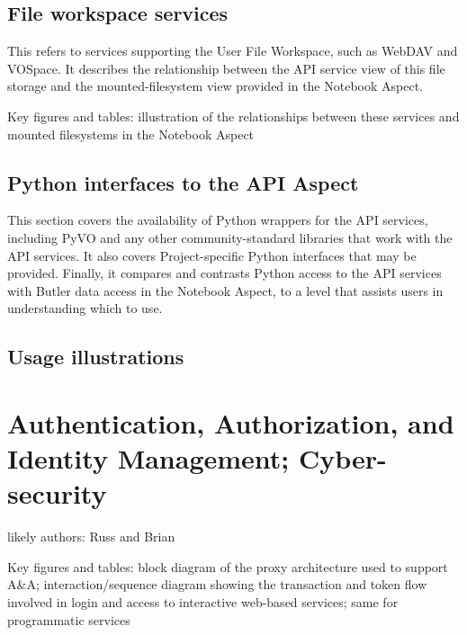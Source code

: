 \subsection{File workspace services}

This refers to services supporting the User File Workspace, such as WebDAV and VOSpace.  It describes the relationship between the API service view of this file storage and the mounted-filesystem view provided in the Notebook Aspect.

Key figures and tables: illustration of the relationships between these services and mounted filesystems in the Notebook Aspect

\subsection{Python interfaces to the API Aspect}

This section covers the availability of Python wrappers for the API services, including PyVO and any other community-standard libraries that work with the API services.  It also covers Project-specific Python interfaces that may be provided.  Finally, it compares and contrasts Python access to the API services with Butler data access in the Notebook Aspect, to a level that assists users in understanding which to use.

\subsection{Usage illustrations}


\section{Authentication, Authorization, and Identity Management; Cyber-security}

likely authors: Russ and Brian


Key figures and tables: block diagram of the proxy architecture used to support A&A; interaction/sequence diagram showing the transaction and token flow involved in login and access to interactive web-based services; same for programmatic services


